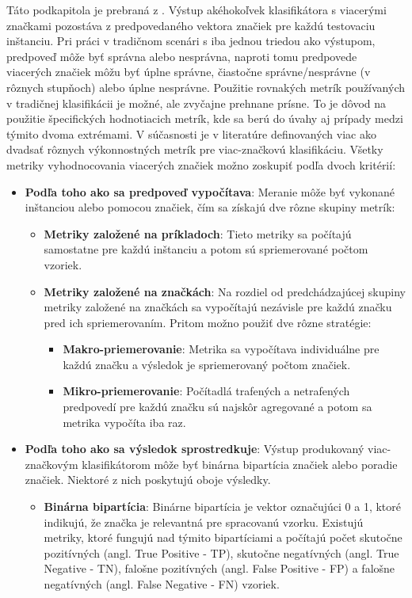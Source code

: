 Táto podkapitola je prebraná z \cite{Herrera:2016}. Výstup akéhokoľvek klasifikátora s viacerými značkami pozostáva z predpovedaného vektora značiek pre každú testovaciu inštanciu. Pri práci v tradičnom scenári s iba jednou triedou ako výstupom,  predpoveď môže byť správna alebo nesprávna, naproti tomu predpovede viacerých značiek môžu byť úplne správne, čiastočne správne/nesprávne (v rôznych stupňoch) alebo úplne nesprávne.
Použitie rovnakých metrík používaných v tradičnej klasifikácii je možné, ale zvyčajne prehnane prísne. To je dôvod na použitie špecifických hodnotiacich metrík, kde sa berú do úvahy aj prípady medzi týmito dvoma extrémami.
V súčasnosti je v literatúre definovaných viac ako dvadsať rôznych výkonnostných metrík pre viac-značkovú klasifikáciu. Všetky metriky vyhodnocovania viacerých značiek možno zoskupiť podľa dvoch kritérií:
\begin{itemize}
\item \textbf{Podľa toho ako sa  predpoveď vypočítava}: Meranie môže byť vykonané inštanciou alebo pomocou
značiek, čím sa získajú dve rôzne skupiny metrík:
    \begin{itemize}
    \item \textbf{Metriky založené na príkladoch}: Tieto metriky sa počítajú samostatne pre každú inštanciu a potom sú  spriemerované počtom vzoriek.
    \item \textbf{Metriky založené na značkách}: Na rozdiel od predchádzajúcej skupiny metriky založené na značkách sa vypočítajú nezávisle pre každú značku pred ich spriemerovaním. Pritom možno použiť dve rôzne stratégie:
        \begin{itemize}
        \item \textbf{Makro-priemerovanie}: Metrika sa vypočítava individuálne pre každú značku a
        výsledok je spriemerovaný počtom značiek.
        \item \textbf{Mikro-priemerovanie}: Počítadlá trafených a netrafených predpovedí pre každú značku sú najskôr agregované a potom sa metrika vypočíta iba raz.
        \end{itemize}
    \end{itemize}
\item \textbf{Podľa toho ako sa výsledok sprostredkuje}: Výstup produkovaný viac-značkovým klasifikátorom môže byť binárna bipartícia značiek alebo poradie značiek. Niektoré z nich poskytujú oboje výsledky.
    \begin{itemize}
    \item \textbf{Binárna bipartícia}: Binárne bipartícia je vektor označujúci 0 a 1, ktoré indikujú, že značka je relevantná pre spracovanú vzorku. Existujú metriky, ktoré fungujú nad týmito bipartíciami a počítajú počet skutočne pozitívných (angl. True Positive - TP), skutočne negatívných (angl. True Negative - TN), falošne pozitívných (angl. False Positive - FP) a falošne negatívných (angl. False Negative - FN) vzoriek.

\end{itemize}
\end{itemize}
